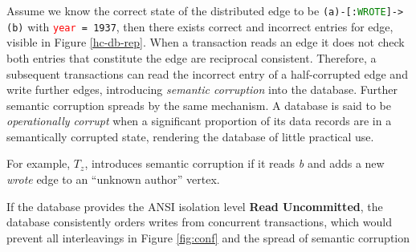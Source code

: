 Assume we know the correct state of the distributed edge to be \texttt{(a)-[:\textcolor{green}{WROTE}]->(b)} with \texttt{\textcolor{red}{year} = 1937}, then there exists correct and incorrect entries for edge, visible in Figure \ref{hc-db-rep}.
When a transaction reads an edge it does not check both entries that constitute the edge are reciprocal consistent.
Therefore, a subsequent transactions can read the incorrect entry of a half-corrupted edge and write further edges, introducing \emph{semantic corruption} into the database.
Further semantic corruption spreads by the same mechanism.
A database is said to be \emph{operationally corrupt} when a significant proportion of its data records are in a semantically corrupted state, rendering the database of little practical use.

For example, $T_z$, introduces semantic corruption if it reads \emph{b} and adds a new \emph{wrote} edge to an ``unknown author'' vertex.



If the database provides the ANSI isolation level \textbf{Read Uncommitted}, the database consistently orders writes from concurrent transactions, which would prevent all interleavings in Figure \ref{fig:conf} and the spread of semantic corruption
